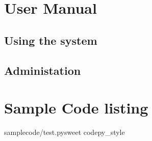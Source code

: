 \appendix
\chapter{User Manual}
\section{Using the system}
\section{Administation}

\chapter{Sample Code listing}
	\begin{codesnippet}{samplecode/test.py}{sweet code}{py_style}
	\end{codesnippet}
